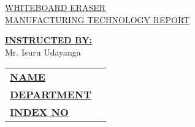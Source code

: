 \documentclass[12pt,a4paper,oneside]{article}
\begin{document}
\begin{titlepage}


    \begin{flushright}
    \end{flushright}


    \vspace*{\fill}
    \begin{center}
        \uppercase{\fontsize{30}{45}\selectfont \ul{Whiteboard Eraser}}\\
        \uppercase{\fontsize{20}{30}\selectfont \ul{Manufacturing Technology Report}}
    \end{center}
    \vfill %


    \begin{multicols}{2}
        \noindent\textbf{\underline{INSTRUCTED BY:}} \\ Mr. Isuru Udayanga\\

        \columnbreak


        \begin{tabular}{ll}
            \vspace{6pt}

            \textbf{\uppercase{\underline{Name}}}       &
            \textbf{\uppercase{\fontsize{12}{18} \selectfont {:}}}
            {\fontsize{12}{18} \selectfont {<Name>}}      \\

            \vspace{6pt}
            \textbf{\uppercase{\underline{Department}}} &
            \textbf{\uppercase{\fontsize{12}{18} \selectfont {:}}}
            {\fontsize{12}{18} \selectfont {<Department>}}\\

            \vspace{6pt}
            \textbf{\uppercase{\underline{Index No}}}   &
            \textbf{\uppercase{\fontsize{12}{18} \selectfont {:}}}
            {\fontsize{12}{18} \selectfont {<Index No>}}  \\



        \end{tabular}
    \end{multicols}

\end{titlepage}
\end{document}
